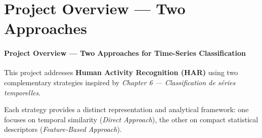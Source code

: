 \documentclass[12pt,a4paper]{report}
\begin{document}
\tableofcontents
\newpage





















\chapter*{Project Overview — Two Approaches}

\subsubsection*{Project Overview — Two Approaches for Time-Series Classification}

This project addresses \textbf{Human Activity Recognition (HAR)} using two complementary strategies
inspired by \textit{Chapter 6 — Classification de séries temporelles}.

Each strategy provides a distinct representation and analytical framework:
one focuses on temporal similarity (\textit{Direct Approach}),
the other on compact statistical descriptors (\textit{Feature-Based Approach}).
\end{document}
